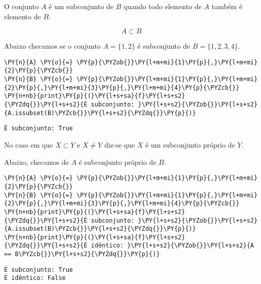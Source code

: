 \documentclass{book}
\begin{document}
        O conjunto $A$ é um subconjunto de $B$ quando todo elemento de $A$ também é elemento de $B$.

        $$A \subset B$$

        \begin{exemplo}
            Abaixo checamos se o conjunto $A=\{1,2\}$ é subconjunto de $B=\{1,2,3,4\}$.



\begin{Verbatim}[commandchars=\\\{\},frame=single,fontsize=\small, xleftmargin=0.5em]
\PY{n}{A} \PY{o}{=} \PY{p}{\PYZob{}}\PY{l+m+mi}{1}\PY{p}{,}\PY{l+m+mi}{2}\PY{p}{\PYZcb{}}
\PY{n}{B} \PY{o}{=} \PY{p}{\PYZob{}}\PY{l+m+mi}{1}\PY{p}{,}\PY{l+m+mi}{2}\PY{p}{,}\PY{l+m+mi}{3}\PY{p}{,}\PY{l+m+mi}{4}\PY{p}{\PYZcb{}}
\PY{n+nb}{print}\PY{p}{(}\PY{l+s+sa}{f}\PY{l+s+s2}{\PYZdq{}}\PY{l+s+s2}{É subconjunto: }\PY{l+s+s2}{\PYZob{}}\PY{l+s+s2}{A.issubset(B)\PYZcb{}}\PY{l+s+s2}{\PYZdq{}}\PY{p}{)}
\end{Verbatim}

\begin{Verbatim}[commandchars=\\\{\},frame=leftline,fontsize=\small, xleftmargin=0.5em]
É subconjunto: True
\end{Verbatim}

        \end{exemplo}

        No caso em que $X \subset Y$ e $X \neq Y$ diz-se que $X$ é um subconjunto próprio de $Y$.

        \begin{exemplo}
            Abaixo, checamos de $A$ é subconjunto próprio de $B$.



\begin{Verbatim}[commandchars=\\\{\},frame=single,fontsize=\small, xleftmargin=0.5em]
\PY{n}{A} \PY{o}{=} \PY{p}{\PYZob{}}\PY{l+m+mi}{1}\PY{p}{,}\PY{l+m+mi}{2}\PY{p}{\PYZcb{}}
\PY{n}{B} \PY{o}{=} \PY{p}{\PYZob{}}\PY{l+m+mi}{1}\PY{p}{,}\PY{l+m+mi}{2}\PY{p}{,}\PY{l+m+mi}{3}\PY{p}{,}\PY{l+m+mi}{4}\PY{p}{\PYZcb{}}
\PY{n+nb}{print}\PY{p}{(}\PY{l+s+sa}{f}\PY{l+s+s2}{\PYZdq{}}\PY{l+s+s2}{É subconjunto: }\PY{l+s+s2}{\PYZob{}}\PY{l+s+s2}{A.issubset(B)\PYZcb{}}\PY{l+s+s2}{\PYZdq{}}\PY{p}{)}
\PY{n+nb}{print}\PY{p}{(}\PY{l+s+sa}{f}\PY{l+s+s2}{\PYZdq{}}\PY{l+s+s2}{É idêntico: }\PY{l+s+s2}{\PYZob{}}\PY{l+s+s2}{A == B\PYZcb{}}\PY{l+s+s2}{\PYZdq{}}\PY{p}{)}
\end{Verbatim}

\begin{Verbatim}[commandchars=\\\{\},frame=leftline,fontsize=\small, xleftmargin=0.5em]
É subconjunto: True
É idêntico: False
\end{Verbatim}

        \end{exemplo}
\end{document}
